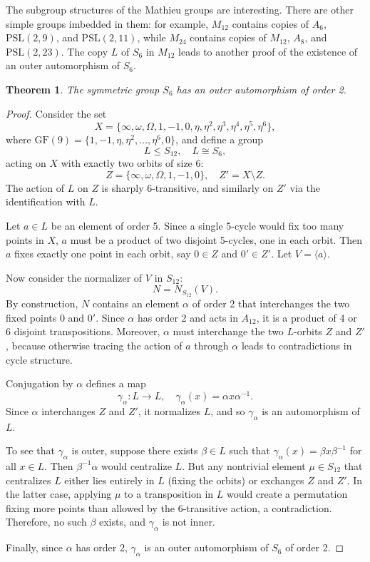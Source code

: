\documentclass[12pt,a4paper,openany]{book}
\newtheorem{theorem}{Theorem}[section]
\newcommand{\GF}{\mathrm{GF}}
\newcommand{\PSL}{\mathrm{PSL}}
\newcommand{\Mtwelve}{M_{12}}
\newcommand{\Mtwentyfour}{M_{24}}
\renewcommand{\PSL}{\mathrm{PSL}}
\renewcommand{\PSL}{\mathrm{PSL}}
\begin{document}
The subgroup structures of the Mathieu groups are interesting. There are other simple groups imbedded in them: for example, $\Mtwelve$ contains copies of $A_6$, $\PSL(2,9)$, and $\PSL(2,11)$, while $\Mtwentyfour$ contains copies of $\Mtwelve$, $A_8$, and $\PSL(2,23)$. The copy $L$ of $S_6$ in $\Mtwelve$ leads to another proof of the existence of an outer automorphism of $S_6$.

\begin{theorem}\label{thm:S6-outer}
The symmetric group $S_6$ has an outer automorphism of order 2.
\end{theorem}

\begin{proof}
Consider the set 
\[
X = \{\infty, \omega, \Omega, 1, -1, 0, \eta, \eta^2, \eta^3, \eta^4, \eta^5, \eta^6\},
\] 
where $\GF(9) = \{1, -1, \eta, \eta^2, \dots, \eta^6, 0\}$, and define a group 
\[
L \leq S_{12}, \quad L \cong S_6,
\]
acting on $X$ with exactly two orbits of size 6:
\[
Z = \{\infty, \omega, \Omega, 1, -1, 0\}, \quad Z' = X \setminus Z.
\]
The action of $L$ on $Z$ is sharply 6-transitive, and similarly on $Z'$ via the identification with $L$.

Let $a \in L$ be an element of order 5. Since a single 5-cycle would fix too many points in $X$, $a$ must be a product of two disjoint 5-cycles, one in each orbit. Then $a$ fixes exactly one point in each orbit, say $0 \in Z$ and $0' \in Z'$. Let $V = \langle a \rangle$.

Now consider the normalizer of $V$ in $S_{12}$:
\[
N = N_{S_{12}}(V).
\]
By construction, $N$ contains an element $\alpha$ of order 2 that interchanges the two fixed points $0$ and $0'$. Since $\alpha$ has order 2 and acts in $A_{12}$, it is a product of 4 or 6 disjoint transpositions. Moreover, $\alpha$ must interchange the two $L$-orbits $Z$ and $Z'$, because otherwise tracing the action of $a$ through $\alpha$ leads to contradictions in cycle structure.

Conjugation by $\alpha$ defines a map 
\[
\gamma_\alpha : L \to L, \quad \gamma_\alpha(x) = \alpha x \alpha^{-1}.
\] 
Since $\alpha$ interchanges $Z$ and $Z'$, it normalizes $L$, and so $\gamma_\alpha$ is an automorphism of $L$.

To see that $\gamma_\alpha$ is outer, suppose there exists $\beta \in L$ such that $\gamma_\alpha(x) = \beta x \beta^{-1}$ for all $x \in L$. Then $\beta^{-1}\alpha$ would centralize $L$. But any nontrivial element $\mu \in S_{12}$ that centralizes $L$ either lies entirely in $L$ (fixing the orbits) or exchanges $Z$ and $Z'$. In the latter case, applying $\mu$ to a transposition in $L$ would create a permutation fixing more points than allowed by the 6-transitive action, a contradiction. Therefore, no such $\beta$ exists, and $\gamma_\alpha$ is not inner.

Finally, since $\alpha$ has order 2, $\gamma_\alpha$ is an outer automorphism of $S_6$ of order 2.
\end{proof}
\end{document}
